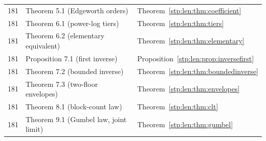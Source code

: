 \documentclass[11pt]{article}
\theoremstyle{remark}\newtheorem{remark}[theorem]{Remark}
\begin{document}
\begin{center}
\begin{longtable}{@{}lll@{}}
181 & Theorem 5.1 (Edgeworth orders) & Theorem~\ref{stp:len:thm:coefficient}\\
181 & Theorem 6.1 (power-log tiers) & Theorem~\ref{stp:len:thm:tiers}\\
181 & Theorem 6.2 (elementary equivalent) & Theorem~\ref{stp:len:thm:elementary}\\
181 & Proposition 7.1 (first inverse) & Proposition~\ref{stp:len:prop:inversefirst}\\
181 & Theorem 7.2 (bounded inverse) & Theorem~\ref{stp:len:thm:boundedinverse}\\
181 & Theorem 7.3 (two-floor envelopes) & Theorem~\ref{stp:len:thm:envelopes}\\
181 & Theorem 8.1 (block-count law) & Theorem~\ref{stp:len:thm:clt}\\
181 & Theorem 9.1 (Gumbel law, joint limit) & Theorem~\ref{stp:len:thm:gumbel}\\
\bottomrule
\end{longtable}
\end{center}
\end{document}
